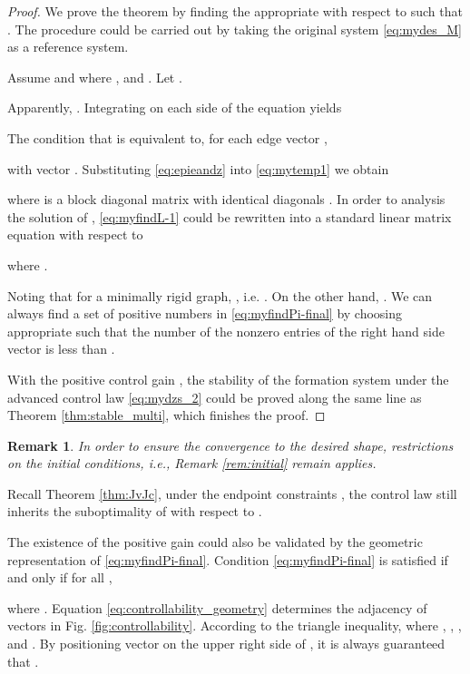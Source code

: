 \documentclass[times]{rncauth}
\newtheorem{rem}{Remark}[section]
\begin{document}
\begin{proof}
    We prove the theorem by finding the appropriate  with respect to 
  such that .
The procedure could be carried out by taking the original system
\eqref{eq:mydes_M} as a reference system.

Assume  and
 where , and
. Let
.

  Apparently, . Integrating on each
  side of the equation yields
  
  The condition that  is equivalent
  to, for each edge vector ,
  
  with vector .
Substituting \eqref{eq:epieandz} into \eqref{eq:mytemp1} we
  obtain
  
  where  is a block diagonal matrix with  identical diagonals .
In order to analysis the solution of , \eqref{eq:myfindL-1}
  could be rewritten into a standard linear matrix equation  with respect to
  

where .

Noting that for a minimally rigid graph, , i.e. . On the other
hand, . We can always find a set of positive
numbers  in \eqref{eq:myfindPi-final} by choosing appropriate
 such that the number of the nonzero entries of the
right hand side vector is less than .




With the positive control gain , the stability of the formation
system under the advanced control law \eqref{eq:mydzs_2} could be
proved along the same line as Theorem \ref{thm:stable_multi}, which
finishes the proof.
\end{proof}
\begin{rem}
  In order to ensure the convergence to the desired shape,
  restrictions on the initial conditions, i.e., Remark
  \ref{rem:initial} remain applies.
\end{rem}


Recall Theorem \ref{thm:JvJc}, under the endpoint constraints
  , the control law  still inherits
the suboptimality of  with respect to
.



The existence of the positive gain  could also be validated by
the geometric representation of \eqref{eq:myfindPi-final}. Condition
\eqref{eq:myfindPi-final} is satisfied if and only if for all
,

where . Equation
\eqref{eq:controllability_geometry} determines the adjacency of
vectors in Fig. \ref{fig:controllability}. According to the triangle
inequality,
 where
, ,
,  and
. By positioning vector
 on the upper right side of , it is
always guaranteed that .
\end{document}
